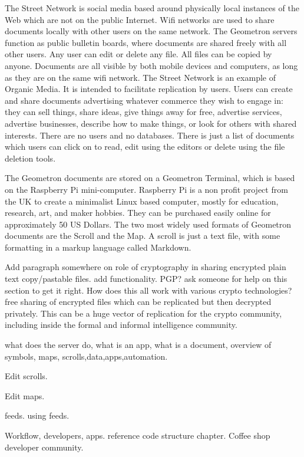 The Street Network is social media based around physically local instances of the Web which are not on the public Internet.  Wifi networks are used to share documents locally with other users on the same network.  The Geometron servers function as public bulletin boards, where documents are shared freely with all other users. Any user can edit or delete any file. All files can be copied by anyone.  Documents are all visible by both mobile devices and computers, as long as they are on the same wifi network.  The Street Network is an example of Organic Media. It is intended to facilitate replication by users.  Users can create and share documents advertising whatever commerce they wish to engage in: they can sell things, share ideas, give things away for free, advertise services, advertise businesses, describe how to make things, or look for others with shared interests.  There are no users and no databases.  There is just a list of documents which users can click on to read, edit using the editors or delete using the file deletion tools.

The Geometron documents are stored on a Geometron Terminal, which is based on the Raspberry Pi mini-computer.  Raspberry Pi is a non profit project from the UK to create a minimalist Linux based computer, mostly for education, research, art, and maker hobbies.   They can be purchased easily online for approximately 50 US Dollars.  The two most widely used formats of Geometron documents are the Scroll and the Map.  A scroll is just a text file, with some formatting in a markup language called Markdown.

Add paragraph somewhere on role of cryptography in sharing encrypted plain text copy/pastable files.  add functionality.  PGP?  ask someone for help on this section to get it right. How does this all work with various crypto technologies?  free sharing of encrypted files which can be replicated but then decrypted privately.  This can be a huge vector of replication for the crypto community, including inside the formal and informal intelligence community.  

what does the server do, what is an app, what is a document, overview of symbols, maps, scrolls,data,apps,automation.

Edit scrolls.

Edit maps.

feeds.  using feeds.

Workflow, developers, apps.  reference code structure chapter. Coffee shop developer community.

